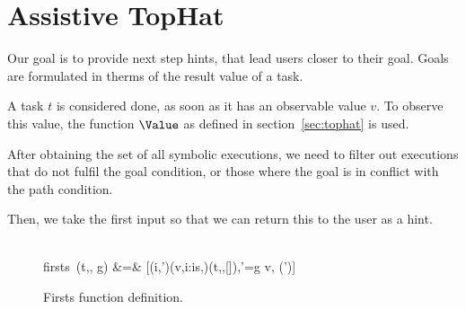 
\section{Assistive TopHat}
\label{sec:assistive}

Our goal is to provide next step hints, that lead users closer to their goal.
Goals are formulated in therms of the result value of a task.

A task $t$ is considered done, as soon as it has an observable value $v$.
To observe this value, the function $\Value$ as defined in section~\ref{sec:tophat} is used.

After obtaining the set of all symbolic executions, we need to filter out executions that do not fulfil the goal condition, or those where the goal is in conflict with the path condition.

Then, we take the first input so that we can return this to the user as a hint.

\begin{figure*}[t]
  \begin{function}
    \signature{firsts :  \times {} \times {}
      \rightarrow {}} \\
    firsts\ (t,\sigma, g) &=& [(i,\phi')\mid (v,i:is,\phi)\leftarrow \Simulate(t,\sigma,[]\True),\phi'=\phi\land g v, \Sat(\phi')]
  \end{function}
  \caption{Firsts function definition.}
  \label{fig:firsts}
\end{figure*}

